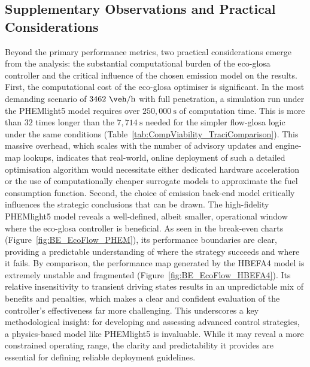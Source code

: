 \subsection*{Supplementary Observations and Practical Considerations}
Beyond the primary performance metrics, two practical considerations emerge from the analysis: the substantial computational burden of the \ac{eco-glosa} controller and the critical influence of the chosen emission model on the results.
\mynewline
First, the computational cost of the \ac{eco-glosa} optimiser is significant. In the most demanding scenario of $3462~\unit{\veh\per\hour}$ with full penetration, a simulation run under the PHEMlight5 model requires over $250,000~\unit{\second}$ of computation time. This is more than $32$ times longer than the $7,714~\unit{\second}$ needed for the simpler \ac{flow-glosa} logic under the same conditions (Table~\vref{tab:CompViability_TraciComparison}). This massive overhead, which scales with the number of advisory updates and engine-map lookups, indicates that real-world, online deployment of such a detailed optimisation algorithm would necessitate either dedicated hardware acceleration or the use of computationally cheaper surrogate models to approximate the fuel consumption function.
\mynewline
Second, the choice of emission back-end model critically influences the strategic conclusions that can be drawn. The high-fidelity PHEMlight5 model reveals a well-defined, albeit smaller, operational window where the \ac{eco-glosa} controller is beneficial. As seen in the break-even charts (Figure~\vref{fig:BE_EcoFlow_PHEM}), its performance boundaries are clear, providing a predictable understanding of where the strategy succeeds and where it fails. By comparison, the performance map generated by the HBEFA4 model is extremely unstable and fragmented (Figure~\vref{fig:BE_EcoFlow_HBEFA4}). Its relative insensitivity to transient driving states results in an unpredictable mix of benefits and penalties, which makes a clear and confident evaluation of the controller's effectiveness far more challenging. This underscores a key methodological insight: for developing and assessing advanced control strategies, a physics-based model like PHEMlight5 is invaluable. While it may reveal a more constrained operating range, the clarity and predictability it provides are essential for defining reliable deployment guidelines.

